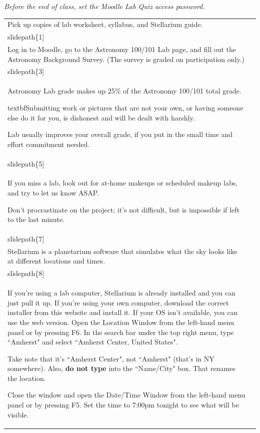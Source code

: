 \documentclass[12pt]{article}
\begin{document}
\newcommand\slidepath[1]{ppt/lab01/Slide#1.jpeg}

\emph{Before the end of class, set the Moodle Lab Quiz access password.}

\begin{longtable}{|m{}|m{}|}\hline
Pick up copies of lab worksheet, syllabus, and Stellarium guide. & \texttt{[image: \\slidepath\{1]}}\\\hline
Log in to Moodle, go to the Astronomy 100/101 Lab page, and fill out the Astronomy Background Survey. (The survey is graded on participation only.) & \texttt{[image: \\slidepath\{3]}}\\\hline
Astronomy Lab grade makes up 25\% of the Astronomy 100/101 total grade.

textbf{Submitting work or pictures that are not your own, or having someone else do it for you, is dishonest and will be dealt with harshly.}

Lab usually improves your overall grade, if you put in the small time and effort commitment needed. & \texttt{[image: \\slidepath\{5]}}\\\hline
If you miss a lab, look out for at-home makeups or scheduled makeup labs, and try to let us know ASAP.

Don't procrastinate on the project; it's not difficult, but is impossible if left to the last minute. & \texttt{[image: \\slidepath\{7]}}\\\hline
Stellarium is a planetarium software that simulates what the sky looks like at different locations and times. & \texttt{[image: \\slidepath\{8]}}\\\hline
If you're using a lab computer, Stellarium is already installed and you can just pull it up. If you're using your own computer, download the correct installer from this website and install it. If your OS isn't available, you can use the web version. Open the Location Window from the left-hand menu panel or by pressing F6. In the search bar under the top right menu, type ``Amherst" and select ``Amherst Center, United States".

Take note that it's ``Amherst Center", not ``Amherst" (that's in NY somewhere). Also, \textbf{do not type} into the ``Name/City" box. That renames the location.

Close the window and open the Date/Time Window from the left-hand menu panel or by pressing F5. Set the time to 7:00pm tonight to see what will be visible.


\end{longtable}
\end{document}
